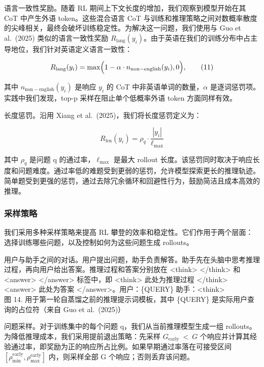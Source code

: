 \documentclass[
  10
]{article}
\begin{document}
语言一致性奖励。随着 RL 期间上下文长度的增加，我们观察到模型开始在其 CoT 中产生外语 token。这些混合语言 CoT 与训练和推理策略之间对数概率散度的尖峰相关，最终会破坏训练稳定性。为解决这一问题，我们使用与 Guo et al.~(2025) 类似的语言一致性奖励 \(R _ { \mathrm { l a n g } } ( y _ { i } )\)。由于英语在我们的训练分布中占主导地位，我们针对英语定义语言一致性：

\[
R _ { \mathrm { l a n g } } ( y _ { i } ) = \operatorname* { m a x } \Bigl ( 1 - \alpha \cdot n _ { \mathrm { n o n - e n g l i s h } } ( y _ { i } ) , 0 \Bigr ) ,\tag{11}
\]

其中 \(n _ { \mathrm { n o n - e n g l i s h } } ( y _ { i } )\) 是响应 \(y _ { i }\) 的 CoT 中非英语单词的数量，$\alpha$ 是逐词惩罚项。实践中我们发现，top-p 采样在阻止单个低概率外语 token 方面同样有效。

长度惩罚。沿用 Xiang et al.~(2025)，我们将长度惩罚定义为：

\[
R _ { \mathrm { l e n } } ( y _ { i } ) = \rho _ { q } \cdot \frac { | y _ { i } | } { \ell _ { \mathrm { m a x } } }\tag{12}
\]

其中 \(\rho _ { q }\) 是问题 q 的通过率，\(\ell _ { \mathrm { m a x } }\) 是最大 rollout 长度。该惩罚同时取决于响应长度和问题难度。通过率低的难题受到更弱的惩罚，允许模型探索更长的推理轨迹。简单题受到更强的惩罚，通过去除冗余循环和回避性行为，鼓励简洁且成本高效的推理。

\subsubsection{采样策略}\label{sampling-strategy}

我们采用多种采样策略来提高 RL 攀登的效率和稳定性。它们作用于两个层面：选择训练哪些问题，以及控制如何为这些问题生成 rollouts。



用户与助手之间的对话。用户提出问题，助手负责解答。助手先在头脑中思考推理过程，再向用户给出答案。推理过程和答案分别放在 <think> </think> 和 <answer> </answer> 标签中，即 <think> 此处为推理过程 </think> <answer> 此处为答案 </answer>。用户：\{QUERY\} 助手：<think> \\
图 14. 用于第一轮自蒸馏之前的推理提示词模板，其中 \{QUERY\} 是实际用户查询的占位符（来自 Guo et al.~(2025)）

问题采样。对于训练集中的每个问题 q，我们从当前推理模型生成一组 rollouts。为降低推理成本，我们采用提前退出策略：先采样 \(G _ { \mathrm { e a r l y } } \ < \ G\) 个响应并计算其经验通过率，即奖励为正的响应所占比例。如果早期通过率落在可接受区间 \([ \rho _ { \mathrm { m i n } } ^ { \mathrm { e a r l y } } , \rho _ { \mathrm { m a x } } ^ { \mathrm { e a r l y } } ]\) 内，则采样全部 G 个响应；否则丢弃该问题。
\end{document}
